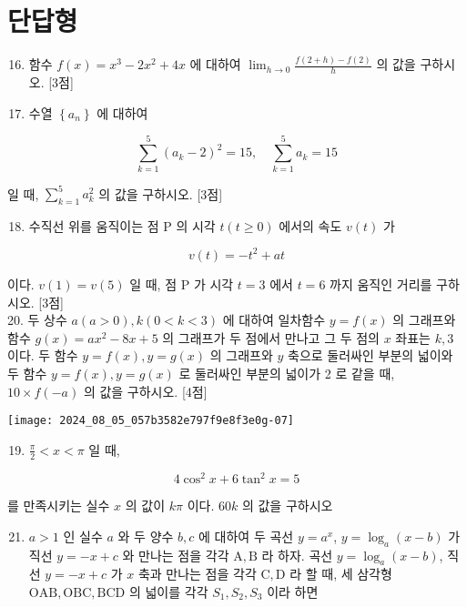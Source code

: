\documentclass[10pt]{article}
\begin{document}
\section*{단답형}
\begin{enumerate}
  \setcounter{enumi}{15}
  \item 함수 \(f(x)=x^{3}-2 x^{2}+4 x\) 에 대하여 \(\lim _{h \rightarrow 0} \frac{f(2+h)-f(2)}{h}\) 의 값을 구하시오. [3점]

  \item 수열 \(\left\{a_{n}\right\}\) 에 대하여

\end{enumerate}

\[
\sum_{k=1}^{5}\left(a_{k}-2\right)^{2}=15, \quad \sum_{k=1}^{5} a_{k}=15
\]

일 때, \(\sum_{k=1}^{5} a_{k}^{2}\) 의 값을 구하시오. [3점]

\begin{enumerate}
  \setcounter{enumi}{17}
  \item 수직선 위를 움직이는 점 P 의 시각 \(t(t \geq 0)\) 에서의 속도 \(v(t)\) 가
\end{enumerate}

\[
v(t)=-t^{2}+a t
\]

이다. \(v(1)=v(5)\) 일 때, 점 P 가 시각 \(t=3\) 에서 \(t=6\) 까지 움직인 거리를 구하시오. [3점]\\
20. 두 상수 \(a(a>0), k(0<k<3)\) 에 대하여 일차함수 \(y=f(x)\) 의 그래프와 함수 \(g(x)=a x^{2}-8 x+5\) 의 그래프가 두 점에서 만나고 그 두 점의 \(x\) 좌표는 \(k, 3\) 이다. 두 함수 \(y=f(x), y=g(x)\) 의 그래프와 \(y\) 축으로 둘러싸인 부분의 넓이와 두 함수 \(y=f(x), y=g(x)\) 로 둘러싸인 부분의 넓이가 2 로 같을 때, \(10 \times f(-a)\) 의 값을 구하시오. [4점]

\begin{center}
\texttt{[image: 2024\_08\_05\_057b3582e797f9e8f3e0g-07]}
\end{center}

\begin{enumerate}
  \setcounter{enumi}{18}
  \item \(\frac{\pi}{2}<x<\pi\) 일 때,
\end{enumerate}

\[
4 \cos ^{2} x+6 \tan ^{2} x=5
\]

를 만족시키는 실수 \(x\) 의 값이 \(k \pi\) 이다. \(60 k\) 의 값을 구하시오

\begin{enumerate}
  \setcounter{enumi}{20}
  \item \(a>1\) 인 실수 \(a\) 와 두 양수 \(b, c\) 에 대하여 두 곡선 \(y=a^{x}\), \(y=\log _{a}(x-b)\) 가 직선 \(y=-x+c\) 와 만나는 점을 각각 \(\mathrm{A}, \mathrm{B}\) 라 하자. 곡선 \(y=\log _{a}(x-b)\), 직선 \(y=-x+c\) 가 \(x\) 축과 만나는 점을 각각 \(\mathrm{C}, \mathrm{D}\) 라 할 때, 세 삼각형 \(\mathrm{OAB}, \mathrm{OBC}, \mathrm{BCD}\) 의 넓이를 각각 \(S_{1}, S_{2}, S_{3}\) 이라 하면
\end{enumerate}
\end{document}
